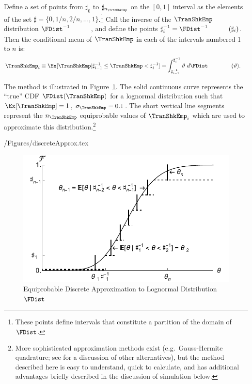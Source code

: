 \documentclass[titlepage, headings=optiontotocandhead]{\econtex}
\begin{document}
Define a set of points from $\sharp_{0}$ to $\sharp_{n_{\TranShkEmp}}$ on the $[0,1]$ interval
as the elements of the set $\sharp = \{0,1/n,2/n, \ldots,1\}$.\footnote{These points define intervals that constitute a partition of the domain of $\FDist$.}  Call the inverse of the $\TranShkEmp$ distribution $\FDist^{-1}_{\phantom{\TranShkEmp}}$, and define the
points $\sharp^{-1}_{i} = \FDist^{-1}_{\phantom{\TranShkEmp}}(\sharp_{i})$.  Then
the conditional mean of $\TranShkEmp$ in each of the intervals numbered 1 to $n$ is:
\begin{equation}\begin{gathered}\begin{aligned}
      \TranShkEmp_{i} \equiv \Ex[\TranShkEmp | \sharp_{i-1}^{-1} \leq \TranShkEmp < \sharp_{i}^{-1}]  & = \int_{\sharp^{-1}_{i-1}}^{\sharp^{-1}_{i}} \vartheta ~ d\FDist_{\phantom{\TranShkEmp}}(\vartheta)  .
    \end{aligned}\end{gathered}\end{equation}

The method is illustrated in Figure~\ref{fig:discreteapprox}.  The solid continuous curve represents
the ``true'' CDF $\FDist(\TranShkEmp)$ for a lognormal distribution such that $\Ex[\TranShkEmp] = 1$, $\sigma_{\TranShkEmp} = 0.1$.  The short vertical line segments represent the $n_{\TranShkEmp}$
equiprobable values of $\TranShkEmp_{i}$ which are used to approximate this
distribution.\footnote{More sophisticated approximation methods exist
  (e.g.\ Gauss-Hermite quadrature; see \cite{kopecky2010finite} for a discussion of other alternatives), but the method described here is easy to understand, quick to calculate, and has additional advantages briefly described in the
  discussion of simulation below.}
\begin{verbatimwrite}{\econtexRoot/Figures/discreteApprox.tex}
  \hypertarget{discreteApprox}{}
  \begin{figure}
    \includegraphics{./Figures/discreteApprox}
    \caption{Equiprobable Discrete Approximation to Lognormal Distribution $\FDist$}
    \label{fig:discreteapprox}
  \end{figure}
\end{verbatimwrite}
\unskip
\end{document}
